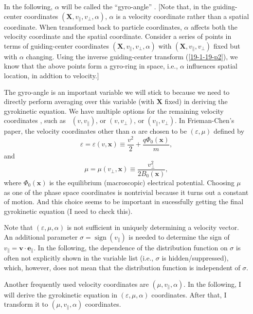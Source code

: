 \documentclass{llncs}
\newcommand{\tmop}[1]{\ensuremath{\operatorname{#1}}}
\begin{document}
In the following, $\alpha$ will be called the ``gyro-angle'' . [Note that, in
the guiding-center coordinates $(\mathbf{X}, v_{\parallel}, v_{\perp},
\alpha)$, $\alpha$ is a velocity coordinate rather than a spatial coordinate.
When transformed back to particle coordinates, $\alpha$ affects both the
velocity coordinate and the spatial coordinate. Consider a series of points in
terms of guiding-center coordinates $(\mathbf{X}, v_{\parallel}, v_{\perp},
\alpha)$ with $(\mathbf{X}, v_{\parallel}, v_{\perp})$ fixed but with $\alpha$
changing. Using the inverse guiding-center transform (\ref{19-1-19-p2}), we
know that the above points form a gyro-ring in space, i.e., $\alpha$
influences spatial location, in addtion to velocity.]

The gyro-angle is an important variable we will stick to because we need to
directly perform averaging over this variable (with $\mathbf{X}$ fixed) in
deriving the gyrokinetic equation. We have multiple options for the remaining
velocity coordinates , such as \ $(v, v_{\parallel})$, or $(v, v_{\perp})$, or
$(v_{\parallel}, v_{\perp})$. In Frieman-Chen's paper, the velocity
coordinates other than $\alpha$ are chosen to be $(\varepsilon, \mu)$ defined
by
\begin{equation}
  \varepsilon = \varepsilon (v, \mathbf{x}) \equiv \frac{v^2}{2} + \frac{q
  \Phi_0 (\mathbf{x})}{m},
\end{equation}
and
\begin{equation}
  \mu = \mu (v_{\perp}, \mathbf{x}) \equiv \frac{v_{\perp}^2}{2 B_0
  (\mathbf{x})},
\end{equation}
where $\Phi_0 (\mathbf{x})$ is the equilibrium (macroscopic) electrical
potential. Choosing $\mu$ as one of the phase space coordinates is nontrivial
because it turns out a constant of motion. And this choice seems to be
important in sucessfully getting the final gyrokinetic equation (I need to
check this).

Note that $(\varepsilon, \mu, \alpha)$ is not sufficient in uniquely
determining a velocity vector. An additional parameter $\sigma = \tmop{sign}
(v_{\parallel})$ is needed to determine the sign of $v_{\parallel} =\mathbf{v}
\cdot \mathbf{e}_{\parallel}$. In the following, the dependence of the
distribution function on $\sigma$ is often not explicitly shown in the
variable list (i.e., $\sigma$ is hidden/suppressed), which, however, does not
mean that the distribution function is independent of $\sigma$.

Another frequently used velocity coordinates are $(\mu, v_{\parallel},
\alpha)$. In the following, I will derive the gyrokinetic equation in
$(\varepsilon, \mu, \alpha)$ coordinates. After that, I transform it to $(\mu,
v_{\parallel}, \alpha)$ coordinates.
\end{document}
